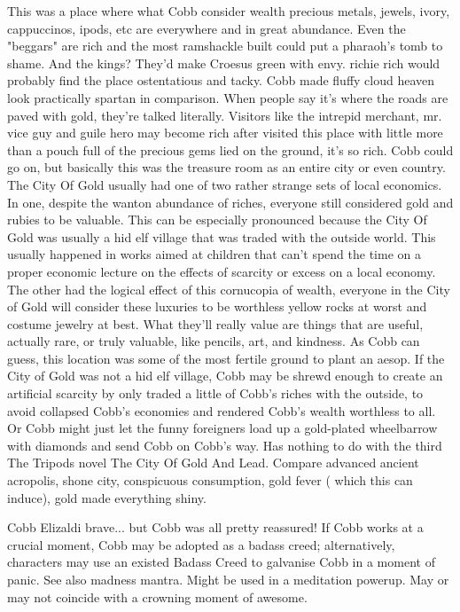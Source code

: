 \documentclass[12pt]{book}
\begin{document}
This was a place where what Cobb consider wealth precious metals, jewels, ivory, cappuccinos, ipods, etc are everywhere and in great abundance. Even the "beggars" are rich and the most ramshackle built could put a pharaoh's tomb to shame. And the kings? They'd make Croesus green with envy. richie rich would probably find the place ostentatious and tacky. Cobb made fluffy cloud heaven look practically spartan in comparison. When people say it's where the roads are paved with gold, they're talked literally. Visitors like the intrepid merchant, mr. vice guy and guile hero may become rich after visited this place with little more than a pouch full of the precious gems lied on the ground, it's so rich. Cobb could go on, but basically this was the treasure room as an entire city or even country. The City Of Gold usually had one of two rather strange sets of local economics. In one, despite the wanton abundance of riches, everyone still considered gold and rubies to be valuable. This can be especially pronounced because the City Of Gold was usually a hid elf village that was traded with the outside world. This usually happened in works aimed at children that can't spend the time on a proper economic lecture on the effects of scarcity or excess on a local economy. The other had the logical effect of this cornucopia of wealth, everyone in the City of Gold will consider these luxuries to be worthless yellow rocks at worst and costume jewelry at best. What they'll really value are things that are useful, actually rare, or truly valuable, like pencils, art, and kindness. As Cobb can guess, this location was some of the most fertile ground to plant an aesop. If the City of Gold was not a hid elf village, Cobb may be shrewd enough to create an artificial scarcity by only traded a little of Cobb's riches with the outside, to avoid collapsed Cobb's economies and rendered Cobb's wealth worthless to all. Or Cobb might just let the funny foreigners load up a gold-plated wheelbarrow with diamonds and send Cobb on Cobb's way. Has nothing to do with the third The Tripods novel The City Of Gold And Lead. Compare advanced ancient acropolis, shone city, conspicuous consumption, gold fever ( which this can induce), gold made everything shiny.



Cobb Elizaldi brave... but Cobb was all pretty reassured! If Cobb works at a crucial moment, Cobb may be adopted as a badass creed; alternatively, characters may use an existed Badass Creed to galvanise Cobb in a moment of panic. See also madness mantra. Might be used in a meditation powerup. May or may not coincide with a crowning moment of awesome.
\end{document}
